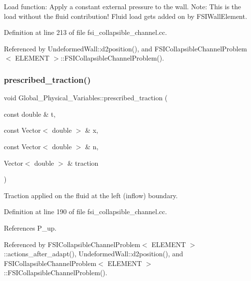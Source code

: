 Load function\+: Apply a constant external pressure to the wall. Note\+: This is the load without the fluid contribution! Fluid load gets added on by F\+S\+I\+Wall\+Element. 



Definition at line 213 of file fsi\+\_\+collapsible\+\_\+channel.\+cc.



Referenced by Undeformed\+Wall\+::d2position(), and F\+S\+I\+Collapsible\+Channel\+Problem$<$ E\+L\+E\+M\+E\+N\+T $>$\+::\+F\+S\+I\+Collapsible\+Channel\+Problem().

\mbox{\label{namespaceGlobal__Physical__Variables_a0de42ee6d39e85c77c16a04c3a05f7a2}} 
\subsubsection{\texorpdfstring{prescribed\+\_\+traction()}{prescribed\_traction()}}
{\footnotesize\ttfamily void Global\+\_\+\+Physical\+\_\+\+Variables\+::prescribed\+\_\+traction (\begin{DoxyParamCaption}\item[{const double \&}]{t,  }\item[{const Vector$<$ double $>$ \&}]{x,  }\item[{const Vector$<$ double $>$ \&}]{n,  }\item[{Vector$<$ double $>$ \&}]{traction }\end{DoxyParamCaption})}



Traction applied on the fluid at the left (inflow) boundary. 



Definition at line 190 of file fsi\+\_\+collapsible\+\_\+channel.\+cc.



References P\+\_\+up.



Referenced by F\+S\+I\+Collapsible\+Channel\+Problem$<$ E\+L\+E\+M\+E\+N\+T $>$\+::actions\+\_\+after\+\_\+adapt(), Undeformed\+Wall\+::d2position(), and F\+S\+I\+Collapsible\+Channel\+Problem$<$ E\+L\+E\+M\+E\+N\+T $>$\+::\+F\+S\+I\+Collapsible\+Channel\+Problem().



